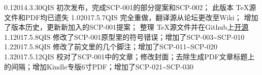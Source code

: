 


\begin{versionhistory}
	\vhEntry
	{0.1}{2014.3.30}{QIS}{
		初次发布，完成SCP-001的部分提案和SCP-002；
		此版本 \TeX 源文件和PDF均已遗失
	}
	\vhEntry
	{1.0}{2017.5.7}{QIS}{
		完全重做，翻译源从论坛更改至Wiki；
		增加了版本历史，更新新加入的SCP-001提案；
		整理 \TeX 源文件并在Github上\href{https://github.com/7sDream/scp-pdf}{开源}
	}
	\vhEntry
	{1.1}{2017.5.8}{QIS}{
		修改了SCP-001原型里的符号错误；增加了SCP-003\textasciitilde SCP-010
	}
	\vhEntry
	{1.2}{2017.5.8}{QIS}{
		修改了前文里的几个脚注；增加了SCP-011\textasciitilde SCP-020
	}
	\vhEntry
	{1.3}{2017.5.12}{QIS}{
		校对了SCP-001中的文章；修改封面；去除生成PDF文章标题上的间隔；增加Kindle专版6寸PDF；增加了SCP-021\textasciitilde SCP-030
	}
\end{versionhistory}
